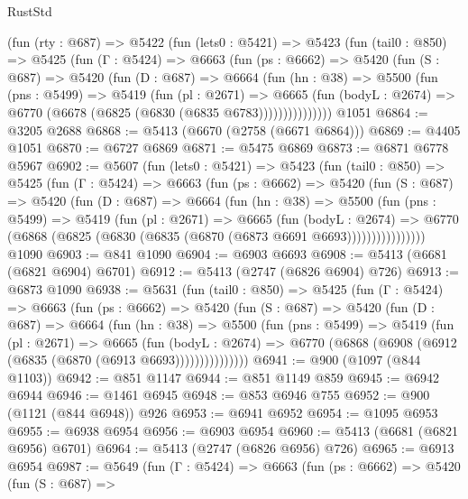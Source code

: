 \begin{lexlean}{RustStd}
\begin{coremodule}
    (fun (rty : @687) =>
    @5422
      (fun (lets0 : @5421) =>
      @5423
        (fun (tail0 : @850) =>
        @5425
          (fun (Γ : @5424) =>
          @6663
            (fun (ps : @6662) =>
            @5420
              (fun (S : @687) =>
              @5420
                (fun (D : @687) =>
                @6664
                  (fun (hn : @38) =>
                  @5500
                    (fun (pns : @5499) =>
                    @5419
                      (fun (pl : @2671) =>
                      @6665
                        (fun (bodyL : @2674) =>
                        @6770 (@6678 (@6825 (@6830 (@6835 @6783)))))))))))))))
    @1051
@6864 := @3205 @2688
@6868 := @5413 (@6670 (@2758 (@6671 @6864)))
@6869 := @4405 @1051
@6870 := @6727 @6869
@6871 := @5475 @6869
@6873 := @6871 @6778 @5967
@6902 := @5607
    (fun (lets0 : @5421) =>
    @5423
      (fun (tail0 : @850) =>
      @5425
        (fun (Γ : @5424) =>
        @6663
          (fun (ps : @6662) =>
          @5420
            (fun (S : @687) =>
            @5420
              (fun (D : @687) =>
              @6664
                (fun (hn : @38) =>
                @5500
                  (fun (pns : @5499) =>
                  @5419
                    (fun (pl : @2671) =>
                    @6665
                      (fun (bodyL : @2674) =>
                      @6770 (@6868 (@6825 (@6830 (@6835 (@6870 (@6873 @6691 @6693))))))))))))))))
    @1090
@6903 := @841 @1090
@6904 := @6903 @6693
@6908 := @5413 (@6681 (@6821 @6904) @6701)
@6912 := @5413 (@2747 (@6826 @6904) @726)
@6913 := @6873 @1090
@6938 := @5631
    (fun (tail0 : @850) =>
    @5425
      (fun (Γ : @5424) =>
      @6663
        (fun (ps : @6662) =>
        @5420
          (fun (S : @687) =>
          @5420
            (fun (D : @687) =>
            @6664
              (fun (hn : @38) =>
              @5500
                (fun (pns : @5499) =>
                @5419
                  (fun (pl : @2671) =>
                  @6665
                    (fun (bodyL : @2674) =>
                    @6770 (@6868 (@6908 (@6912 (@6835 (@6870 (@6913 @6693)))))))))))))))
@6941 := @900 (@1097 (@844 @1103))
@6942 := @851 @1147
@6944 := @851 @1149 @859
@6945 := @6942 @6944
@6946 := @1461 @6945
@6948 := @853 @6946 @755
@6952 := @900 (@1121 (@844 @6948)) @926
@6953 := @6941 @6952
@6954 := @1095 @6953
@6955 := @6938 @6954
@6956 := @6903 @6954
@6960 := @5413 (@6681 (@6821 @6956) @6701)
@6964 := @5413 (@2747 (@6826 @6956) @726)
@6965 := @6913 @6954
@6987 := @5649
    (fun (Γ : @5424) =>
    @6663
      (fun (ps : @6662) =>
      @5420
        (fun (S : @687) =>

\end{coremodule}
\end{lexlean}
